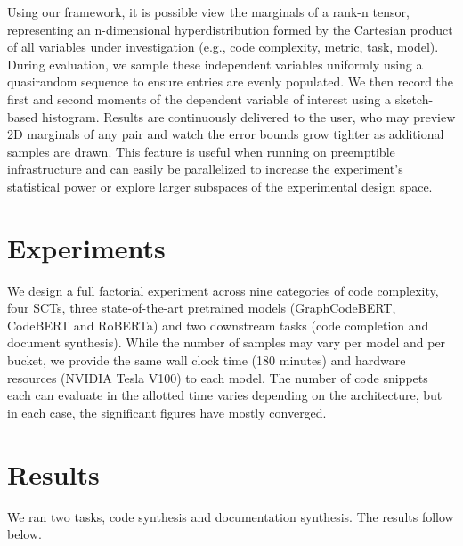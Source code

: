 \documentclass[usenames,dvipsnames]{article} %
\begin{document}
  Using our framework, it is possible view the marginals of a rank-n tensor, representing an n-dimensional hyperdistribution formed by the Cartesian product of all variables under investigation (e.g., code complexity, metric, task, model). During evaluation, we sample these independent variables uniformly using a quasirandom sequence to ensure entries are evenly populated. We then record the first and second moments of the dependent variable of interest using a sketch-based histogram. Results are continuously delivered to the user, who may preview 2D marginals of any pair and watch the error bounds grow tighter as additional samples are drawn. This feature is useful when running on preemptible infrastructure and can easily be parallelized to increase the experiment's statistical power or explore larger subspaces of the experimental design space.

  \section{Experiments}\label{sec:experiments}


  We design a full factorial experiment across nine categories of code complexity, four SCTs, three state-of-the-art pretrained models (GraphCodeBERT, CodeBERT and RoBERTa) and two downstream tasks (code completion and document synthesis). While the number of samples may vary per model and per bucket, we provide the same wall clock time (180 minutes) and hardware resources (NVIDIA Tesla V100) to each model. The number of code snippets each can evaluate in the allotted time varies depending on the architecture, but in each case, the significant figures have mostly converged.

  \section{Results}\label{sec:results}

  We ran two tasks, code synthesis and documentation synthesis. The results follow below.
\end{document}
